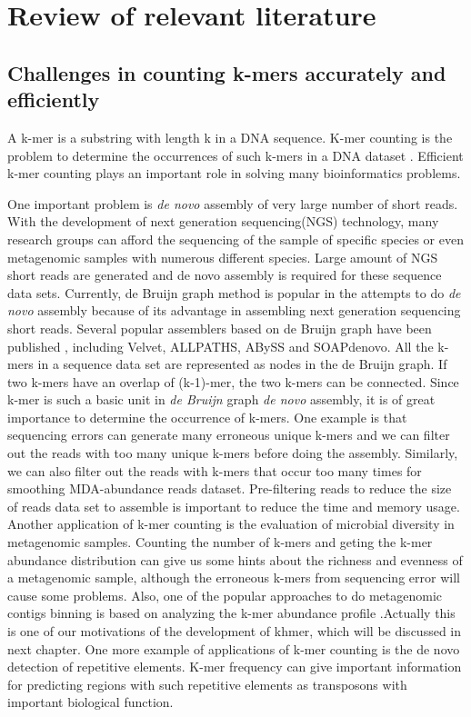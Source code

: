 \chapter{Review of relevant literature}


\section{Challenges in counting k-mers accurately and efficiently}

A k-mer is a substring with length k in a DNA sequence. K-mer counting is the
problem to determine the occurrences of such k-mers in a DNA dataset 
\cite{Marcais2011}. Efficient k-mer counting plays an important role in solving many
bioinformatics problems. 

One important problem is \textit{de novo} assembly of very large number of short reads.
With the development of next generation sequencing(NGS) technology, many research
groups can afford the sequencing of the sample of specific species or even
metagenomic samples with numerous different species\cite{pubmed19997069}. 
Large amount of NGS short reads are generated and de novo assembly is
required for these sequence data sets\cite{pubmed20211242}. Currently, de Bruijn graph method is
popular in the attempts to do \textit{de novo} assembly because of its advantage in
assembling next generation sequencing short reads\cite{Pevzner2001}. Several
popular assemblers based on de Bruijn graph have been published , including 
Velvet\cite{Zerbino2008}, ALLPATHS\cite{Butler2008}, ABySS\cite{Simpson2009}
and SOAPdenovo\cite{Li2010}. All the k-mers in a sequence
data set are represented as nodes in the de Bruijn graph. If
two k-mers have an overlap of (k-1)-mer, the two k-mers can be connected. Since
k-mer is such a basic unit in \textit{de Bruijn} graph \textit{de novo}
assembly, it is of
great importance to determine the occurrence of k-mers. One example is that
sequencing errors can generate many erroneous unique k-mers and we can filter
out the reads with too many unique k-mers before doing the assembly. Similarly,
we can also filter out the reads with k-mers that occur too many times for
smoothing MDA-abundance reads dataset. Pre-filtering reads to reduce the size
of reads data set to assemble is important to reduce the time and memory usage.
Another application of k-mer counting is the evaluation of microbial diversity
in metagenomic samples. Counting the number of k-mers and geting the k-mer
abundance distribution can give us some hints about the richness and evenness
of a metagenomic sample, although the erroneous k-mers from sequencing error
will cause some problems. Also, one of the popular approaches to do metagenomic
contigs binning is based on analyzing the k-mer abundance profile 
\cite{Patil:2012aa} \cite{Brady:2011aa}\cite{Rosen:2011aa}.Actually this is 
one of our motivations of the development of khmer, which
will be discussed in next chapter. One more example of applications of 
k-mer counting is the de novo detection of repetitive
elements. K-mer frequency can give important information for predicting regions
with such repetitive elements as transposons with important biological
function.\cite{Kurtz2008}

